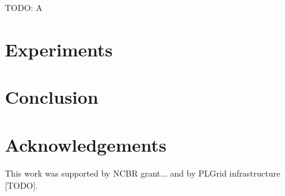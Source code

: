 \documentclass{IOS-Book-Article}
\theoremstyle{definition}
\begin{document}
TODO: A



\section{Experiments}
\label{sec:experiments}



\section{Conclusion}



\section*{Acknowledgements}

This work was supported by NCBR grant... and by PLGrid infrastructure [TODO].


\end{document}
